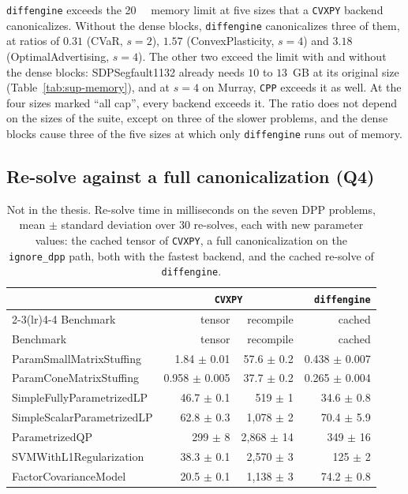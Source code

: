 \documentclass[letterpaper,12pt]{article}
\newcommand{\ac}[1]{#1}
\begin{document}
\texttt{diffengine} exceeds the \SI{20}{\giga\byte} memory limit at five sizes that a
\texttt{CVXPY} backend canonicalizes. Without the dense blocks, \texttt{diffengine} canonicalizes
three of them, at ratios of
$0.31$ (CVaR, $s = 2$), $1.57$ (ConvexPlasticity, $s = 4$) and $3.18$ (OptimalAdvertising,
$s = 4$). The other two exceed the limit with and without the dense blocks: SDPSegfault1132
already needs $10$ to $13$~GB at its original size (Table~\ref{tab:sup-memory}), and at
$s = 4$ on Murray, \texttt{CPP} exceeds it as well. At the four sizes marked ``all cap'', every
backend exceeds it. The ratio does not depend on the sizes of the suite, except on three of
the slower problems, and the dense blocks cause three of the five sizes at which only
\texttt{diffengine} runs out of memory.

\subsection{Re-solve against a full canonicalization (Q4)}

{\footnotesize
\setlength{\tabcolsep}{4pt}
\begin{longtable}{l rr r}
\caption{Not in the thesis. Re-solve time in milliseconds on the seven \ac{DPP} problems, mean
$\pm$ standard deviation over $30$ re-solves, each with new parameter values: the cached tensor of
\texttt{CVXPY}, a full canonicalization on the \texttt{ignore\_dpp} path, both with the fastest
backend, and the cached re-solve of \texttt{diffengine}.}\label{tab:sup-warm}\\
\toprule
& \multicolumn{2}{c}{\texttt{CVXPY}} & \texttt{diffengine} \\
\cmidrule(lr){2-3}\cmidrule(lr){4-4}
Benchmark & tensor & recompile & cached \\
\midrule
\endfirsthead
\toprule
Benchmark & tensor & recompile & cached \\
\midrule
\endhead
\bottomrule
\endfoot
ParamSmallMatrixStuffing & 1.84 $\pm$ 0.01 & 57.6 $\pm$ 0.2 & 0.438 $\pm$ 0.007 \\
ParamConeMatrixStuffing & 0.958 $\pm$ 0.005 & 37.7 $\pm$ 0.2 & 0.265 $\pm$ 0.004 \\
SimpleFullyParametrizedLP & 46.7 $\pm$ 0.1 & 519 $\pm$ 1 & 34.6 $\pm$ 0.8 \\
SimpleScalarParametrizedLP & 62.8 $\pm$ 0.3 & 1{,}078 $\pm$ 2 & 70.4 $\pm$ 5.9 \\
ParametrizedQP & 299 $\pm$ 8 & 2{,}868 $\pm$ 14 & 349 $\pm$ 16 \\
SVMWithL1Regularization & 38.3 $\pm$ 0.1 & 2{,}570 $\pm$ 3 & 125 $\pm$ 2 \\
FactorCovarianceModel & 20.5 $\pm$ 0.1 & 1{,}138 $\pm$ 3 & 74.2 $\pm$ 0.8 \\
\end{longtable}}
\end{document}
